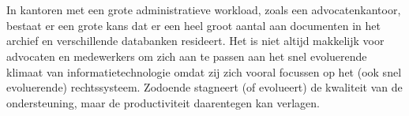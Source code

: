 
%
%
%
%
%

%



\chapter*{}

In kantoren met een grote administratieve workload, zoals een advocatenkantoor, bestaat er een grote kans dat er een heel groot aantal aan documenten 
in het archief en verschillende databanken resideert.  Het is niet altijd makkelijk voor advocaten en medewerkers om zich aan te passen aan het snel evoluerende klimaat van informatietechnologie omdat zij zich vooral 
focussen op het (ook snel evoluerende) rechtssysteem. Zodoende stagneert (of evolueert) de kwaliteit van de ondersteuning, maar de productiviteit daarentegen kan verlagen.  \\

